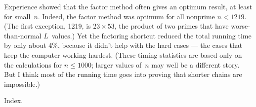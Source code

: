 Experience showed that the factor method often gives
an optimum result,
at least for small~$n$. Indeed, the factor method was optimum for all
nonprime $n<1219$. (The first exception, 1219, is $23\times53$, the
product of two primes that have worse-than-normal $L$~values.)
Yet the factoring shortcut reduced the total running time by only
about 4\%, because it didn't help with the hard cases --- the cases that
keep the computer working hardest. (These timing statistics are based
only on the calculations for $n\le1000$; larger values of~$n$ may well
be a different story. But I think most of the running time goes into
proving that shorter chains are impossible.)

\fi

Index.
\fi

\inx
\fin
\con
